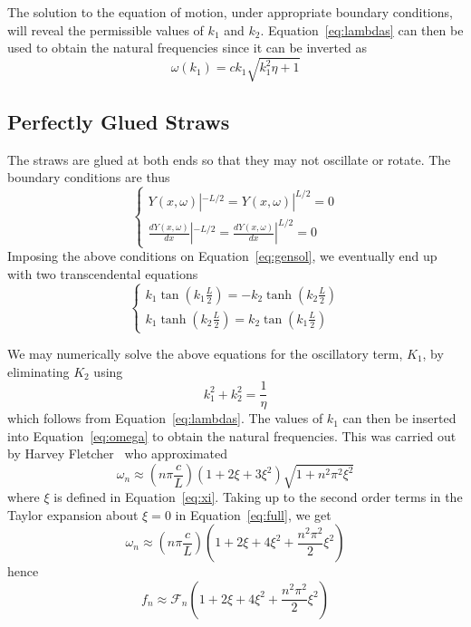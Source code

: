 \documentclass[twoside]{article}
\begin{document}
\begin{multicols}{2}
The solution to the equation of motion, under appropriate boundary conditions, will reveal the permissible values of $k_1$ and $k_2$. Equation~\ref{eq:lambdas} can then be used to obtain the natural frequencies since it can be inverted as
\begin{equation}
\omega(k_1) =  c k_1 \sqrt{ k^2_1 \eta + 1}
\label{eq:omega}
\end{equation}





\subsection{Perfectly Glued Straws}
The straws are glued at both ends so that they may not oscillate or rotate.  The boundary conditions are thus
\begin{equation}
\label{eq:clamped}
\begin{cases}
Y(x,\omega)|^{-L/2} = Y(x,\omega)|^{L/2} = 0 \\
\frac{dY(x,\omega)}{dx}|^{-L/2} = \frac{dY(x,\omega)}{dx}|^{L/2} = 0 
\end{cases} 
\end{equation}
Imposing the above conditions on Equation~\ref{eq:gensol}, we eventually end up with two transcendental equations
\begin{equation}
\begin{cases}
k_1 \tan(k_1 \frac{L}{2}) = - k_2 \tanh(k_2 \frac{L}{2}) \\
k_1 \tanh(k_2 \frac{L}{2}) =  k_2 \tan(k_1 \frac{L}{2})  
\end{cases} 
\label{eq:trans}
\end{equation}

We may numerically solve the above equations for the oscillatory term, $K_1$, by eliminating $K_2$ using
\begin{equation}
k^2_1 + k^2_2 = \frac{1}{\eta}
\label{eq:rel}
\end{equation}
which follows from Equation~\ref{eq:lambdas}. The values of $k_1$ can then be inserted into Equation~\ref{eq:omega} to obtain the natural frequencies.  This was carried out by Harvey Fletcher~\cite{fletcher} who approximated 
 \begin{equation}
 	\omega_n \approx (n \pi \frac{c}{L})(1 + 2\xi + 3 \xi^2)\sqrt{1 + n^2\pi^2\xi^2}
 \label{eq:full}
 \end{equation}
 where $\xi$ is defined in Equation~\ref{eq:xi}.
 Taking up to the second order terms in the Taylor expansion about $\xi = 0$ in Equation~\ref{eq:full}, we get
  \begin{equation}
  \omega_n \approx (n \pi \frac{c}{L}) (1 + 2\xi + 4\xi^2 + \frac{n^2\pi^2}{2}\xi^2)
  \end{equation}
 hence
  \begin{equation}
  	f_n \approx \mathcal{F}_n (1 + 2\xi + 4\xi^2 + \frac{n^2\pi^2}{2}\xi^2)
 \label{eq:hence}
 \end{equation}
  

\end{multicols}
\end{document}
